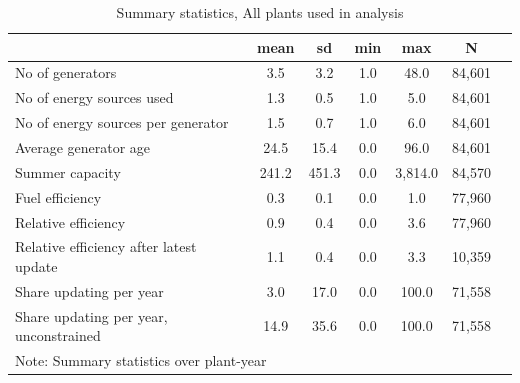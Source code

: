 \begin{table}[htbp]\centering
\footnotesize
\def\sym#1{\ifmmode^{#1}\else\(^{#1}\)\fi}
\caption{Summary statistics, All plants used in analysis}
\begin{tabular}{l*{1}{cccccc}}
\hline\hline

                    &        mean&          sd&         min&         max&           N\\
\hline
No of generators    &         3.5&         3.2&         1.0&        48.0&    84,601\\
No of energy sources used&         1.3&         0.5&         1.0&         5.0&    84,601\\
No of energy sources per generator&         1.5&         0.7&         1.0&         6.0&    84,601\\
Average generator age&        24.5&        15.4&         0.0&        96.0&    84,601\\
Summer capacity     &       241.2&       451.3&         0.0&     3,814.0&    84,570\\
Fuel efficiency     &         0.3&         0.1&         0.0&         1.0&    77,960\\
Relative efficiency &         0.9&         0.4&         0.0&         3.6&    77,960\\
Relative efficiency after latest update&         1.1&         0.4&         0.0&         3.3&    10,359\\
Share updating per year&         3.0&        17.0&         0.0&       100.0&    71,558\\
Share updating per year, unconstrained&        14.9&        35.6&         0.0&       100.0&    71,558\\
\hline\hline
\multicolumn{6}{l}{\footnotesize Note: Summary statistics over plant-year}\\
\end{tabular}
\end{table}
